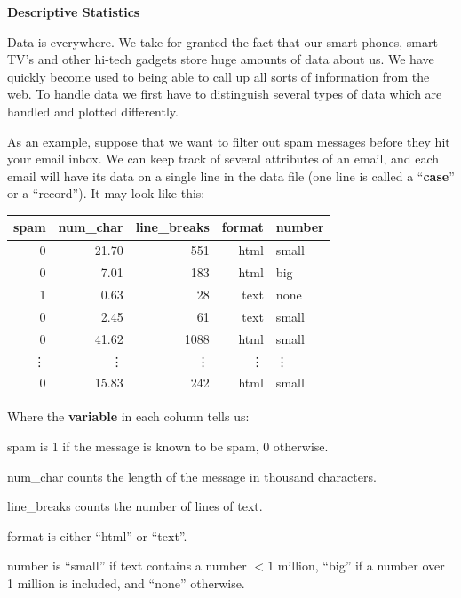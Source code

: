 \def\theTopic{Reading 1}


\begin{center}
{\bf {\large Descriptive Statistics}}
\end{center}

Data is everywhere.  We take for granted the fact that our smart
phones, smart TV's and other hi-tech gadgets store
huge amounts of data about us.  We have quickly become used to being
able to call up all sorts of information from the web. 
To handle data we first have to distinguish several types of data
which are handled and plotted differently.

As an example, suppose that we want to filter out spam messages before
they hit your email inbox.  We can keep track of several attributes
of an email, and each email will have its data on a single line in the
data file (one line is  called a ``{\bf case}'' or a  ``record''). It
may look like this:

\begin{table}[ht]
\centering
\begin{tabular}{rrrrl}
  \hline
 spam & num\_char & line\_breaks & format & number \\ 
  \hline
   0 & 21.70 & 551 &html& small \\ 
   0 & 7.01 & 183 &html& big \\ 
   1 & 0.63 &  28 &text& none \\ 
   0 & 2.45 &  61 &text& small \\ 
   0 & 41.62 & 1088 &html& small \\ 
 \vdots&\vdots&\vdots&\vdots&\vdots\\
   0 & 15.83 & 242 &html& small \\ 
   \hline
\end{tabular}
\end{table}

Where the {\bf variable} in each column tells us:\vspace{-.8cm}
\begin{list}{}{}
  \item [spam] is 1 if the message is known to be spam, 0 otherwise.
  \item [num\_char] counts the length of the message in thousand characters.
  \item [line\_breaks] counts the number of lines of text.
  \item [format] is either ``html'' or ``text''.
  \item [number] is ``small'' if text contains a number $< 1 $ million,
    ``big'' if a number over 1 million is included, and ``none'' otherwise. 
\end{list}

